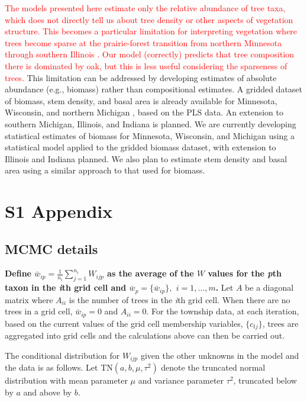 \documentclass[10pt,letterpaper]{article}
\begin{document}
\textcolor{red}{The models presented here estimate only the relative
abundance of tree taxa, which does not directly tell us about tree
density or other aspects of vegetation structure. This becomes a particular
limitation for interpreting vegetation where trees become sparse at
the prairie-forest transition from northern Minnesota through southern
Illinois \cite{transeau1935prairie}. Our model (correctly) predicts
that tree composition there is dominated by oak, but this is less
useful considering the sparseness of trees.} This limitation can be
addressed by developing estimates of absolute abundance (e.g., biomass)
rather than compositional estimates. A gridded dataset of biomass,
stem density, and basal area is already available for Minnesota, Wisconsin,
and northern Michigan \cite{goring2015composition}, based on the
PLS data. An extension to southern Michigan, Illinois, and Indiana
is planned. We are currently developing statistical estimates of biomass
for Minnesota, Wisconsin, and Michigan using a statistical model applied
to the gridded biomass dataset, with extension to Illinois and Indiana
planned. We also plan to estimate stem density and basal area using
a similar approach to that used for biomass.



\section*{S1 Appendix}
\label{SI}

\subsection*{MCMC details}

{\bf Define $\bar{w}_{ip}=\frac{1}{n_{i}}{\displaystyle \sum_{j=1}^{n_{i}}W_{ijp}}$
as the average of the $W$ values for the \emph{p}th taxon in the \emph{i}th
grid cell and $\bar{w}_{p}=\{\bar{w}_{ip}\},$ $i=1,\ldots,m$.} Let
$A$ be a diagonal matrix where $A_{ii}$ is the number of trees in
the \emph{i}th grid cell. When there are no trees in a grid cell, $\bar{w}_{ip}=0$
and $A_{ii}=0$. For the township data, at each iteration, based on
the current values of the grid cell membership variables, $\{c_{tj}\}$,
trees are aggregated into grid cells and the calculations above can
then be carried out.

The conditional distribution for $W_{ijp}$ given the other unknowns
in the model and the data is as follows. Let $\mbox{TN}(a,b,\mu,\tau^{2})$
denote the truncated normal distribution with mean parameter $\mu$
and variance parameter $\tau^{2}$, truncated below by $a$ and above
by $b$. 
\end{document}
